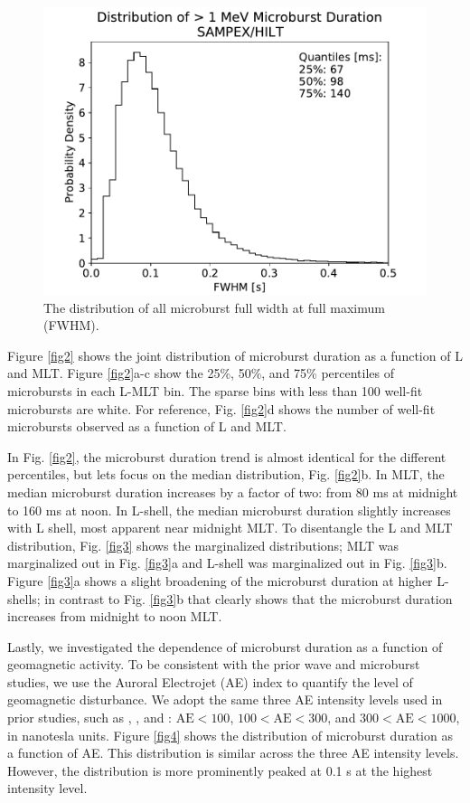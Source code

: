 \documentclass[draft]{agujournal2019}
\begin{document}
\begin{figure}
\noindent\includegraphics[width=\textwidth]{figures/figX.pdf}
\caption{The distribution of all microburst full width at full maximum (FWHM).}
\label{figX}
\end{figure}

Figure \ref{fig2} shows the joint distribution of microburst duration as a function of L and MLT. Figure \ref{fig2}a-c show the 25\%, 50\%, and 75\% percentiles of microbursts in each L-MLT bin. The sparse bins with less than 100 well-fit microbursts are white. For reference, Fig. \ref{fig2}d shows the number of well-fit microbursts observed as a function of L and MLT.

In Fig. \ref{fig2}, the microburst duration trend is almost identical for the different percentiles, but lets focus on the median distribution, Fig. \ref{fig2}b. In MLT, the median microburst duration increases by a factor of two: from 80 ms at midnight to 160 ms at noon. In L-shell, the median microburst duration slightly increases with L shell, most apparent near midnight MLT. To disentangle the L and MLT distribution, Fig. \ref{fig3} shows the marginalized distributions; MLT was marginalized out in Fig. \ref{fig3}a and L-shell was marginalized out in Fig. \ref{fig3}b. Figure \ref{fig3}a shows a slight broadening of the microburst duration at higher L-shells; in contrast to Fig. \ref{fig3}b that clearly shows that the microburst duration increases from midnight to noon MLT.

Lastly, we investigated the dependence of microburst duration as a function of geomagnetic activity. To be consistent with the prior wave and microburst studies, we use the Auroral Electrojet (AE) index to quantify the level of geomagnetic disturbance. We adopt the same three AE intensity levels used in prior studies, such as , , and : $\mathrm{AE} < 100$, $100 < \mathrm{AE} < 300$, and $300 < \mathrm{AE} < 1000$, in nanotesla units. Figure \ref{fig4} shows the distribution of microburst duration as a function of AE. This distribution is similar across the three AE intensity levels. However, the distribution is more prominently peaked at 0.1 s at the highest intensity level.
\end{document}
